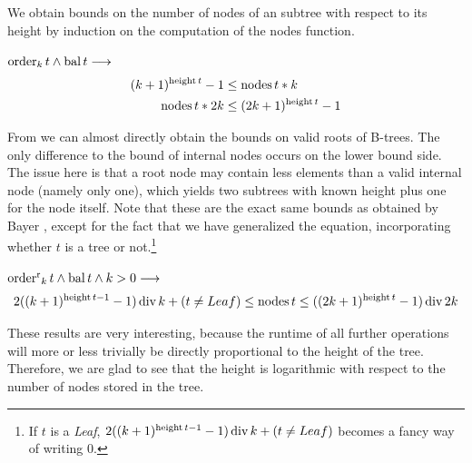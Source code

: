 
We obtain bounds
on the number of nodes of an subtree with respect to its height
by induction on the computation of the nodes function.

\begin{lemma}
    \label{lem:bound_internal_node}
    $\operatorname{order}_k t \wedge \operatorname{bal} t \longrightarrow$
    \begin{align}
        (k+1)^{\operatorname{height} t} - 1 &\le \operatorname{nodes} t * k \\
        \operatorname{nodes} t * 2k &\le (2k+1)^{\operatorname{height} t} - 1
    \end{align}
\end{lemma}

From  we can almost directly obtain
the bounds on valid roots of B-trees.
The only difference to the bound of internal nodes occurs on the lower bound side.
The issue here is that a root node may contain less elements than
a valid internal node (namely only one), which yields two subtrees with known height
plus one for the node itself.
Note that these are the exact same bounds as obtained by Bayer \parencite{DBLP:journals/acta/BayerM72},
except for the fact that we have generalized the equation,
incorporating whether $t$ is a tree or not.\footnote{
    If $t$ is a \textit{Leaf},
    $2((k+1)^{\operatorname{height} t - 1} - 1) \operatorname{div} k + (t \neq Leaf)$ becomes a fancy way of writing $0$.
}

\begin{theorem}
    \label{thm:bound_btree}
    $\operatorname{order^r}_k t \wedge \operatorname{bal} t \wedge k > 0 \longrightarrow$
    \begin{equation}
        2((k+1)^{\operatorname{height} t - 1} - 1) \operatorname{div} k + (t \neq Leaf) \le \operatorname{nodes} t \le ((2k+1)^{\operatorname{height} t} - 1) \operatorname{div} 2k
    \end{equation}
\end{theorem}

These results are very interesting, because
the runtime of all further operations will more or less trivially be
directly proportional to the height of the tree.
Therefore, we are glad to see that the height is logarithmic
with respect to the number of nodes stored in the tree.

